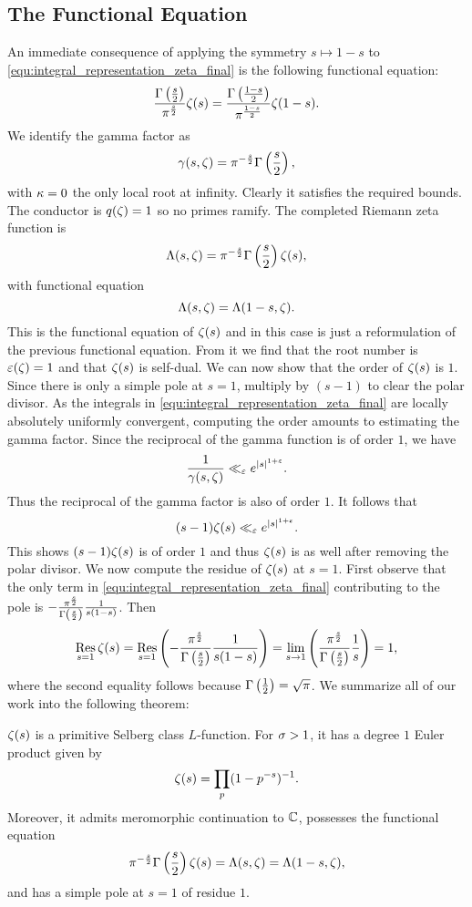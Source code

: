     \subsection*{The Functional Equation}
      An immediate consequence of applying the symmetry $s \mapsto 1-s$ to \cref{equ:integral_representation_zeta_final} is the following functional equation:
      \[
        \frac{\Gamma\left(\frac{s}{2}\right)}{\pi^{\frac{s}{2}}}\zeta(s) = \frac{\Gamma\left(\frac{1-s}{2}\right)}{\pi^{\frac{1-s}{2}}}\zeta(1-s).
      \]
      We identify the gamma factor as
      \[
        \gamma(s,\zeta) = \pi^{-\frac{s}{2}}\Gamma\left(\frac{s}{2}\right),
      \]
      with $\kappa = 0$ the only local root at infinity. Clearly it satisfies the required bounds. The conductor is $q(\zeta) = 1$ so no primes ramify. The completed Riemann zeta function is
      \[
        \Lambda(s,\zeta) = \pi^{-\frac{s}{2}}\Gamma\left(\frac{s}{2}\right)\zeta(s),
      \]
      with functional equation
      \[
        \Lambda(s,\zeta) = \Lambda(1-s,\zeta).
      \]
      This is the functional equation of $\zeta(s)$ and in this case is just a reformulation of the previous functional equation. From it we find that the root number is $\varepsilon(\zeta) = 1$ and that $\zeta(s)$ is self-dual. We can now show that the order of $\zeta(s)$ is $1$. Since there is only a simple pole at $s = 1$, multiply by $(s-1)$ to clear the polar divisor. As the integrals in \cref{equ:integral_representation_zeta_final} are locally absolutely uniformly convergent, computing the order amounts to estimating the gamma factor. Since the reciprocal of the gamma function is of order $1$, we have
      \[
        \frac{1}{\gamma(s,\zeta)} \ll_{\varepsilon} e^{|s|^{1+\varepsilon}}.
      \]
      Thus the reciprocal of the gamma factor is also of order $1$. It follows that
      \[
        (s-1)\zeta(s) \ll_{\varepsilon} e^{|s|^{1+\varepsilon}}.
      \]
      This shows $(s-1)\zeta(s)$ is of order $1$ and thus $\zeta(s)$ is as well after removing the polar divisor. We now compute the residue of $\zeta(s)$ at $s = 1$. First observe that the only term in \cref{equ:integral_representation_zeta_final} contributing to the pole is $-\frac{\pi^{\frac{s}{2}}}{\Gamma\left(\frac{s}{2}\right)}\frac{1}{s(1-s)}$. Then
      \[
        \operatorname*{\mathrm{Res}}_{s = 1}\zeta(s) = \operatorname*{\mathrm{Res}}_{s = 1}\left(-\frac{\pi^{\frac{s}{2}}}{\Gamma\left(\frac{s}{2}\right)}\frac{1}{s(1-s)}\right) = \lim_{s \to 1}\left(\frac{\pi^{\frac{s}{2}}}{\Gamma\left(\frac{s}{2}\right)}\frac{1}{s}\right) = 1,
      \]
      where the second equality follows because $\Gamma\left(\frac{1}{2}\right) = \sqrt{\pi}$. We summarize all of our work into the following theorem:

      \begin{theorem}\label{thm:zeta_Selberg}
        $\zeta(s)$ is a primitive Selberg class $L$-function. For $\sigma > 1$, it has a degree $1$ Euler product given by
        \[
          \zeta(s) = \prod_{p}(1-p^{-s})^{-1}.
        \]
        Moreover, it admits meromorphic continuation to $\mathbb{C}$, possesses the functional equation
        \[
          \pi^{-\frac{s}{2}}\Gamma\left(\frac{s}{2}\right)\zeta(s) = \Lambda(s,\zeta) = \Lambda(1-s,\zeta),
        \]
        and has a simple pole at $s = 1$ of residue $1$.
      \end{theorem}


